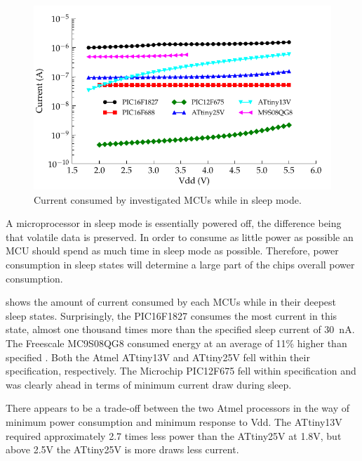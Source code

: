       \begin{figure}
        \centering
        \includegraphics{content/pt1/03-EnergyRequirements/graphics/Graph_All_Sleeping_Current}
        \caption{\label{fig:All_Sleep_Current}Current consumed by investigated MCUs while in sleep mode.}
      \end{figure}

      A microprocessor in sleep mode is essentially powered off, the difference being that volatile data is preserved.
      In order to consume as little power as possible an MCU should spend as much time in sleep mode as possible.
      Therefore, power consumption in sleep states will determine a large part of the chips overall power consumption.

       shows the amount of current consumed by each MCUs while in their deepest sleep states.
      Surprisingly, the PIC16F1827 consumes the most current in this state, almost one thousand times more than the specified sleep current of \SI{30}{\nano\ampere}\cite{PIC16F1827}.
      The Freescale MC9S08QG8 consumed energy at an average of 11\% higher than specified \cite{MC9S08QG8}.
      Both the Atmel ATtiny13V and ATtiny25V fell within their specification, \cite{AtmelATtiny13,AtmelATtiny25} respectively.
      The Microchip PIC12F675 fell within specification\cite{PIC12F675} and was clearly ahead in terms of minimum current draw during sleep.

      There appears to be a trade-off between the two Atmel processors in the way of minimum power consumption and minimum response to Vdd.
      The ATtiny13V required approximately 2.7 times less power than the ATtiny25V at 1.8V, but above 2.5V the ATtiny25V is more draws less current.


